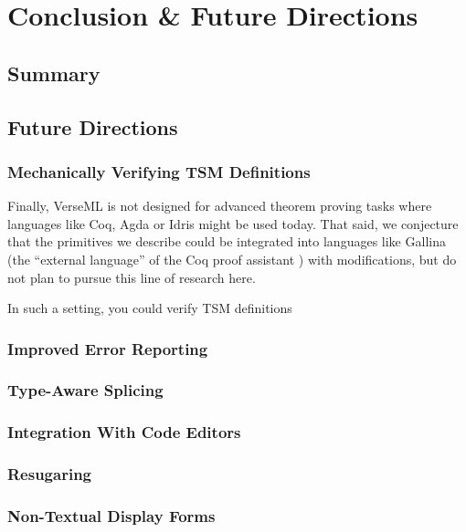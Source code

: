 \chapter{Conclusion \& Future Directions}\label{chap:conclusion}
\section{Summary}

\section{Future Directions}
\subsection{Mechanically Verifying TSM Definitions}\label{sec:verifying-tsms}
Finally, VerseML is not designed for advanced theorem proving tasks where languages like Coq, Agda or Idris might be used today. That said, we conjecture that the primitives we describe could be integrated into languages like Gallina (the ``external language'' of the Coq proof assistant  \cite{Coq:manual}) with  modifications, but do not plan to pursue this line of research here.

In such a setting, you could verify TSM definitions 
\subsection{Improved Error Reporting}\label{sec:error-handling}
\subsection{Type-Aware Splicing}\label{sec:type-aware-splicing}
\subsection{Integration With Code Editors}\label{sec:interaction-with-tools}
\subsection{Resugaring}\label{sec:resugaring}
\subsection{Non-Textual Display Forms}\label{sec:non-textual-display-forms}
